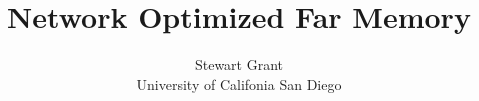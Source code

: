 \documentclass[10pt,twocolumn]{article}
\begin{document}
\title{Network Optimized Far Memory}
\author{Stewart Grant \\ University of Califonia San Diego}
\date{}

\maketitle




\balance
\vspace{-0.3cm}
{\footnotesize 
}
\vspace{-0.5cm}
\end{document}
